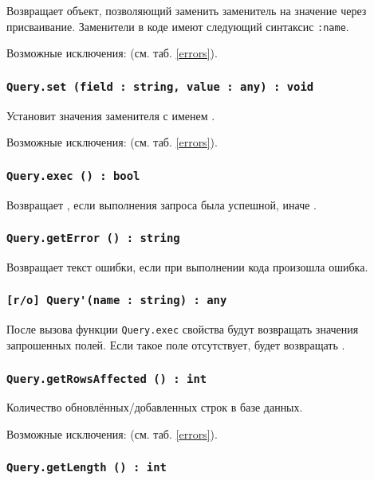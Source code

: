 Возвращает объект, позволяющий заменить заменитель на значение через присваивание. Заменители в коде имеют следующий синтаксис \lstinline|:name|.

Возможные исключения:  (см. таб. \ref{errors}).

\subsubsection{\lstinline|Query.set (field : string, value : any) : void|}

Установит значения заменителя с именем .

Возможные исключения:  (см. таб. \ref{errors}).

\subsubsection{\lstinline|Query.exec () : bool|}

Возвращает \true, если выполнения запроса была успешной, иначе \false.

\subsubsection{\lstinline|Query.getError () : string|}

Возвращает текст ошибки, если при выполнении кода произошла ошибка.

\subsubsection{\lstinline|[r/o] Query'(name : string) : any|}

После вызова функции \lstinline|Query.exec| свойства будут возвращать значения запрошенных полей. Если такое поле отсутствует, будет возвращать \void.

\subsubsection{\lstinline|Query.getRowsAffected () : int|}

Количество обновлённых/добавленных строк в базе данных.

Возможные исключения:  (см. таб. \ref{errors}).

\subsubsection{\lstinline|Query.getLength () : int|}

